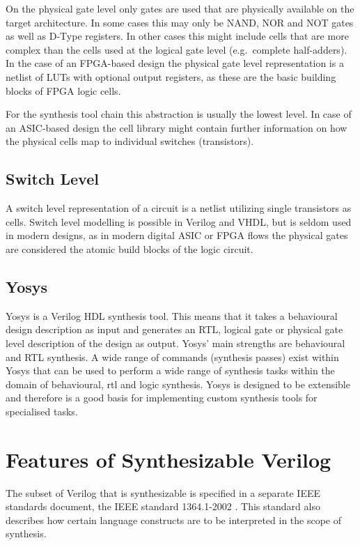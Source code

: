 On the physical gate level only gates are used that are physically available on
the target architecture. In some cases this may only be NAND, NOR and NOT gates as well as
D-Type registers. In other cases this might include cells that are more complex than the cells
used at the logical gate level (e.g.~complete half-adders). In the case of an FPGA-based
design the physical gate level representation is a netlist of LUTs with optional output
registers, as these are the basic building blocks of FPGA logic cells.

For the synthesis tool chain this abstraction is usually the lowest level. In
case of an ASIC-based design the cell library might contain further information on
how the physical cells map to individual switches (transistors).

\subsection{Switch Level}

A switch level representation of a circuit is a netlist utilizing single transistors as cells.
Switch level modelling is possible in Verilog and VHDL, but is seldom used in modern designs,
as in modern digital ASIC or FPGA flows the physical gates are considered the atomic build blocks
of the logic circuit.

\subsection{Yosys}

Yosys is a Verilog HDL synthesis tool. This means that it takes a behavioural
design description as input and generates an RTL, logical gate or physical gate
level description of the design as output.  Yosys' main strengths are behavioural
and RTL synthesis. A wide range of commands (synthesis passes) exist
within Yosys that can be used to perform a wide range of synthesis tasks within
the domain of behavioural, rtl and logic synthesis. Yosys is designed to be
extensible and therefore is a good basis for implementing custom synthesis
tools for specialised tasks.

\section{Features of Synthesizable Verilog}

The subset of Verilog \cite{Verilog2005} that is synthesizable is specified in
a separate IEEE standards document, the IEEE standard 1364.1-2002 \cite{VerilogSynth}.
This standard also describes how certain language constructs are to be interpreted in
the scope of synthesis.

